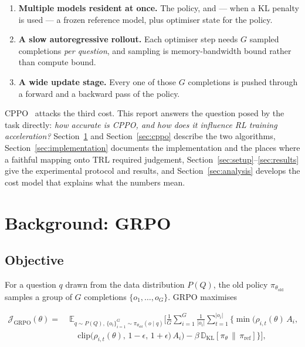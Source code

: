\documentclass[11pt,a4paper]{article}
\newcommand{\Adv}{A}
\newcommand{\polold}{\pi_{\theta_{\mathrm{old}}}}
\newcommand{\polref}{\pi_{\mathrm{ref}}}
\newcommand{\pol}{\pi_{\theta}}
\begin{document}
\begin{enumerate}
  \item \textbf{Multiple models resident at once.} The policy, and --- when a
  KL penalty is used --- a frozen reference model, plus optimiser state for
  the policy.
  \item \textbf{A slow autoregressive rollout.} Each optimiser step needs $G$
  sampled completions \emph{per question}, and sampling is memory-bandwidth
  bound rather than compute bound.
  \item \textbf{A wide update stage.} Every one of those $G$ completions is
  pushed through a forward and a backward pass of the policy.
\end{enumerate}

CPPO~\cite{lin2025cppo} attacks the third cost. This report answers the
question posed by the task directly: \emph{how accurate is CPPO, and how does
it influence RL training acceleration?} Section~\ref{sec:grpo} and
Section~\ref{sec:cppo} describe the two algorithms,
Section~\ref{sec:implementation} documents the implementation and the places
where a faithful mapping onto TRL required judgement,
Section~\ref{sec:setup}--\ref{sec:results} give the experimental protocol and
results, and Section~\ref{sec:analysis} develops the cost model that explains
what the numbers mean.

\section{Background: GRPO}
\label{sec:grpo}

\subsection{Objective}

For a question $q$ drawn from the data distribution $P(Q)$, the old policy
$\polold$ samples a group of $G$ completions $\{o_1,\dots,o_G\}$. GRPO
maximises

\begin{equation}
\label{eq:grpo}
\begin{split}
\mathcal{J}_{\mathrm{GRPO}}(\theta) =\;
&\mathbb{E}_{q \sim P(Q),\, \{o_i\}_{i=1}^{G} \sim \polold(o \mid q)}
\Bigg[ \frac{1}{G}\sum_{i=1}^{G} \frac{1}{|o_i|} \sum_{t=1}^{|o_i|}
\Big\{ \min\Big( \rho_{i,t}(\theta)\, \Adv_i,\\
&\quad \mathrm{clip}\big(\rho_{i,t}(\theta),\, 1-\epsilon,\, 1+\epsilon\big)\,
\Adv_i \Big) - \beta\, \mathbb{D}_{\mathrm{KL}}\!\left[\pol \,\|\, \polref\right]
\Big\} \Bigg],
\end{split}
\end{equation}
\end{document}
